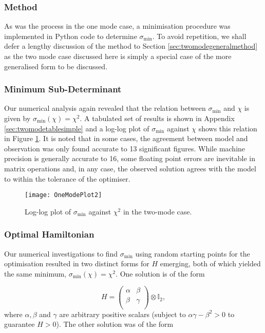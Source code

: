 \documentclass[11pt,a4paper]{article}
\numberwithin{equation}{section}
\begin{document}
	\subsubsection{Method}
	As was the process in the one mode case, a minimisation procedure was implemented in Python code to determine $\sigma_\text{min}$. To avoid repetition, we shall defer a lengthy discussion of the method to Section \ref{sec:twomodegeneralmethod} as the two mode case discussed here is simply a special case of the more generalised form to be discussed.
	
	\subsubsection{Minimum Sub-Determinant}
	
	
	Our numerical analysis again revealed that the relation between $\sigma_\text{min}$ and $\chi$ is given by $\sigma_\text{min}(\chi)=\chi^{2}$. A tabulated set of results is shown in Appendix \ref{sec:twomodetablesimple} and a log-log plot of $\sigma_\text{min}$ against $\chi$ shows this relation in Figure \ref{fig:TwoModePlot}. It is noted that in some cases, the agreement between model and observation was only found accurate to 13 significant figures. While machine precision is generally accurate to 16, some floating point errors are inevitable in matrix operations and, in any case, the observed solution agrees with the model to within the tolerance of the optimiser.
	
	\begin{figure}
		\centering
		\texttt{[image: OneModePlot2]}
		\caption[Two mode case: log-log plot of $\sigma_\text{min}$ against $\chi^2$]{Log-log plot of $\sigma_\text{min}$ against $\chi^2$ in the two-mode case.}
		\label{fig:TwoModePlot}
	\end{figure}
	
	\subsubsection{Optimal Hamiltonian}
	
	Our numerical investigations to find $\sigma_\text{min}$ using random starting points for the optimisation resulted in two distinct forms for $H$ emerging, both of which yielded the same minimum, $\sigma_\text{min}(\chi)=\chi^{2}$. One solution is of the form
	
	\begin{equation}\label{eq:45}
		H = \begin{pmatrix}
			\alpha & \beta \\
			\beta & \gamma \\
		\end{pmatrix} \otimes \mathbb{I}_2,
	\end{equation}
	where $\alpha, \beta$ and $\gamma$ are arbitrary positive scalars (subject to $\alpha\gamma - \beta^2 > 0$ to guarantee $H>0$). The other solution was of the form
\end{document}

